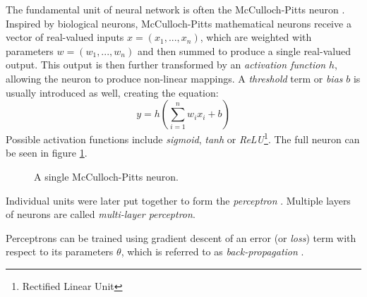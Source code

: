 The fundamental unit of neural network is often the McCulloch-Pitts neuron \cite{first-neuron}. Inspired by biological neurons, McCulloch-Pitts mathematical neurons receive a vector of real-valued inputs $x = (x_1, ..., x_n)$, which are weighted with parameters $w = (w_1, ..., w_n)$ and then summed to produce a single real-valued output. This output is then further transformed by an \textit{activation function} $h$, allowing the neuron to produce non-linear mappings. A \textit{threshold} term or \textit{bias} $b$ is usually introduced as well, creating the equation:
\begin{equation*}
    y = h\left(\sum_{i=1}^n w_i x_i + b \right)
\end{equation*}
Possible activation functions include \textit{sigmoid}, \textit{tanh} or \textit{ReLU}\footnote{Rectified Linear Unit}. The full neuron can be seen in figure \ref{fig:neuron}.
\begin{figure}[ht]
    \centering
    \caption{A single McCulloch-Pitts neuron.}
    \label{fig:neuron}
\end{figure}
Individual units were later put together to form the \textit{perceptron} \cite{first-perceptron}. Multiple layers of neurons are called \textit{multi-layer perceptron}.

Perceptrons can be trained using gradient descent of an error (or \textit{loss}) term with respect to its parameters $\theta$, which is referred to as \textit{back-propagation} \cite{back-propagation}.

